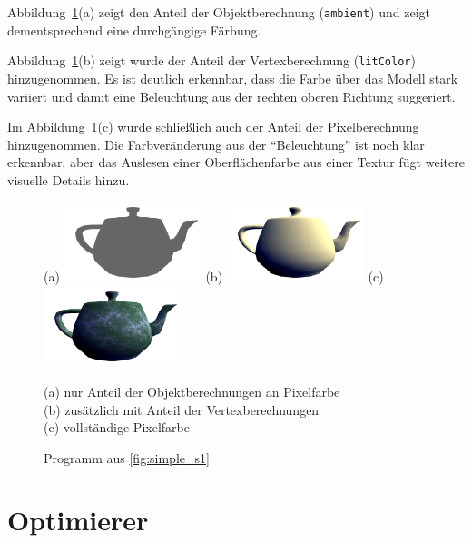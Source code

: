 \documentclass[twoside,a4paper,fleqn,12pt]{book}
\begin{document}
Abbildung~\ref{fig:simple_s1_images}(a) zeigt den Anteil der Objektberechnung (\texttt{ambient}) und zeigt dementsprechend eine durchgängige Färbung.

Abbildung~\ref{fig:simple_s1_images}(b) zeigt wurde der Anteil der Vertexberechnung (\texttt{litColor}) hinzugenommen. Es ist deutlich erkennbar,
dass die Farbe über das Modell stark variiert und damit eine Beleuchtung aus der rechten oberen Richtung suggeriert.

Im Abbildung~\ref{fig:simple_s1_images}(c) wurde schließlich auch der Anteil der Pixelberechnung hinzugenommen. Die Farbveränderung aus der "`Beleuchtung"'
ist noch klar erkennbar, aber das Auslesen einer Oberflächenfarbe aus einer Textur fügt weitere visuelle Details hinzu.

\begin{figure}[h]
  \centering
  (a) \includegraphics[width=4cm]{simple_s1_mesh}\qquad
  (b) \includegraphics[width=4cm]{simple_s1_vert}\qquad
  (c) \includegraphics[width=4cm]{simple_s1_frag}
  \caption{Programm aus \ref{fig:simple_s1}}
  \small (a) nur Anteil der Objektberechnungen an Pixelfarbe\\
  (b) zusätzlich mit Anteil der Vertexberechnungen\\
  (c) vollständige Pixelfarbe\\
  \label{fig:simple_s1_images}
\end{figure}

\clearpage
\section{Optimierer}
\end{document}
